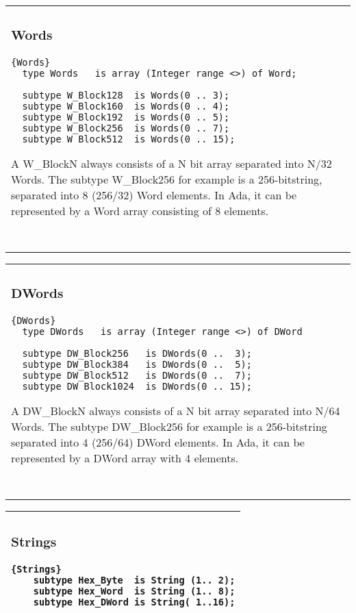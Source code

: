 
\begin{tabular}{p{\textwidth}}
  \subsubsection{Words} 
  \begin{lstlisting}{Words}
  type Words   is array (Integer range <>) of Word;
  
  subtype W_Block128  is Words(0 .. 3);
  subtype W_Block160  is Words(0 .. 4);
  subtype W_Block192  is Words(0 .. 5);
  subtype W_Block256  is Words(0 .. 7);
  subtype W_Block512  is Words(0 .. 15);
  \end{lstlisting}
  A W\_BlockN always consists of a N bit array separated into N/32 Words.
  The subtype W\_Block256 for example is a 256-bitstring, separated into 8 (256/32) Word
  elements. In Ada, it can be represented by a Word array consisting of 8 elements.\\ \ \\
\hline
\end{tabular}

  
\begin{tabular}{p{\textwidth}}
  \subsubsection{DWords} 
  \begin{lstlisting}{DWords}
  type DWords   is array (Integer range <>) of DWord  
    
  subtype DW_Block256   is DWords(0 ..  3);
  subtype DW_Block384   is DWords(0 ..  5);
  subtype DW_Block512   is DWords(0 ..  7);
  subtype DW_Block1024  is DWords(0 .. 15);
  \end{lstlisting}
  A DW\_BlockN always consists of a N bit array separated into N/64 Words.
  The subtype DW\_Block256 for example is a 256-bitstring separated into 4 
  (256/64) DWord
  elements. In Ada, it can be represented by a DWord array with 4 elements.\\ 
\ \\
\hline
\end{tabular}

  
\begin{tabular}{p{\textwidth}}
  \subsubsection{Strings} 
  \begin{lstlisting}{Strings}
    subtype Hex_Byte  is String (1.. 2);
    subtype Hex_Word  is String (1.. 8);
    subtype Hex_DWord is String( 1..16);
  \end{lstlisting}\ \\
  \hline
\end{tabular}

